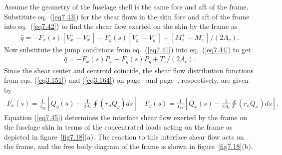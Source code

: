 \documentclass{AeroStructure-ERJohnson}
\begin{document}
Assume the geometry of the fuselage shell is the same fore and aft of the frame. Substitute eq.~(\ref{eq7.43}) for the shear flows in the skin fore and aft of the frame into eq.~(\ref{eq7.42}) to find the shear flow exerted on the skin by the frame as
\begin{align}\label{eq7.44}
\bar{q}=-F_{x}(s)\left[V_{x}^{+}-V_{x}^{-}\right]-F_{y}(s)\left[V_{y}^{+}-V_{y}^{-}\right]+\left[M_{z}^{+}-M_{z}^{-}\right] /\left(2 A_{c}\right).
\end{align}
Now substitute the jump conditions from eq.~(\ref{eq7.41}) into eq.~(\ref{eq7.44}) to get
\begin{align}\label{eq7.45}
\bar{q}=-F_{x}(s) P_{x}-F_{y}(s) P_{y}+T_{z} /\left(2 A_{c}\right).
\end{align}
Since the shear center and centroid coincide, the shear flow distribution functions from eqs. (\ref{eq3.151}) and (\ref{eq3.164}) on page~\pageref{eq3.151} and page~\pageref{eq3.164}, respectively, are given by
\begin{align}\label{eq7.46}
F_{x}(s)=\frac{1}{I_{y y}}\left[Q_{y}(s)-\frac{1}{2 A_{c}} \oint\left(r_{n} Q_{y}\right) d s\right] \quad F_{y}(s)=\frac{1}{I_{x x}}\left[Q_{x}(s)-\frac{1}{2 A_{c}} \oint\left(r_{n} Q_{x}\right) d s\right].
\end{align}
Equation (\ref{eq7.45}) determines the interface shear flow exerted by the frame on the fuselage skin in terms of the concentrated loads acting on the frame as depicted in figure~\ref{fig7.18}(a). The reaction to this interface shear flow acts on the frame, and the free body diagram of the frame is shown in figure~\ref{fig7.18}(b).

{\def\thefigure{7.18}
}

\vspace*{-2\baselineskip}
\end{document}
